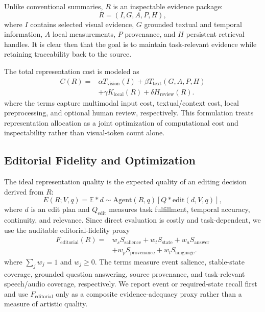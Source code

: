 \documentclass[conference]{IEEEtran}
\begin{document}
Unlike conventional summaries, $R$ is an inspectable evidence package:
\begin{equation}
R=(I,G,A,P,H),
\label{eq:package}
\end{equation}
where $I$ contains selected visual evidence, $G$ grounded textual and temporal information, $A$ local measurements, $P$ provenance, and $H$ persistent retrieval handles. It is clear then that the goal is to maintain task-relevant evidence while retaining traceability back to the source.

The total representation cost is modeled as
\begin{equation}
\begin{aligned}
C(R)={}&\alpha T_{\mathrm{vision}}(I)+\beta T_{\mathrm{text}}(G,A,P,H)\\
&+\gamma K_{\mathrm{local}}(R)+\delta H_{\mathrm{review}}(R).
\end{aligned}
\label{eq:cost}
\end{equation}
where the terms capture multimodal input cost, textual/context cost, local preprocessing, and optional human review, respectively. This formulation treats representation allocation as a joint optimization of computational cost and inspectability rather than visual-token count alone.


\subsection{Editorial Fidelity and Optimization}

The ideal representation quality is the expected quality of an editing decision derived from $R$:
\begin{equation}
E(R;V,q)=
\mathbb{E}*{d\sim\mathrm{Agent}(R,q)}
\left[Q*{\mathrm{edit}}(d,V,q)\right],
\end{equation}
where $d$ is an edit plan and $Q_{\mathrm{edit}}$ measures task fulfillment, temporal accuracy, continuity, and relevance. Since direct evaluation is costly and task-dependent, we use the auditable editorial-fidelity proxy
\begin{equation}
\begin{aligned}
F_{\mathrm{editorial}}(R)={}&w_sS_{\mathrm{salience}}+w_tS_{\mathrm{state}}+w_aS_{\mathrm{answer}}\\
&+w_pS_{\mathrm{provenance}}+w_lS_{\mathrm{language}}.
\end{aligned}
\label{eq:fidelity}
\end{equation}
where $\sum_jw_j=1$ and $w_j\geq0$. The terms measure event salience, stable-state coverage, grounded question answering, source provenance, and task-relevant speech/audio coverage, respectively. We report event or required-state recall first and use $F_{\mathrm{editorial}}$ only as a composite evidence-adequacy proxy rather than a measure of artistic quality.
\end{document}

